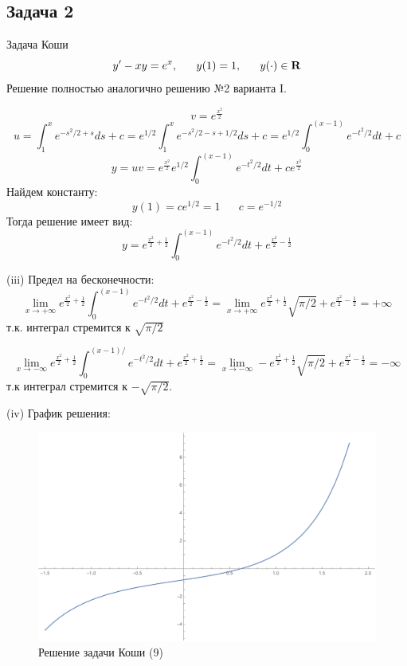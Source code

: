 \documentclass[a4paper, 12pt]{article}
\begin{document}
	\subsection {Задача 2}

Задача Коши 
\begin{equation}
	y'-xy=e^{x},\;\;\;\;\;\;y(1) = 1, \;\;\;\;\;\;y(\cdot) \in \bf{R}
\end{equation}
Решение полностью аналогично решению №2 варианта I.


\[v= e^{\frac{x^2} 2}\]
\[u=\int_{1}^x e^{-s^2/2+s} ds+ c= e^{1/2} \int_{1}^{x} e^{-s^2/2-s+1/2} ds+c = e^{1/2}\int_0^{(x-1)} e^{-t^2/2} dt+c\]
\[y = uv = e^{\frac{x^2} 2}  e^{1/2}\int_{0}^{(x-1)} e^{-t^2/2} dt+ce^{\frac{x^2} 2}\] 
Найдем константу:
\[y(1)=ce^{1/2}=1\;\;\;\;\;\; c = e^{-1/2}\]
Тогда решение имеет вид:
\[y =e^{\frac{x^2} 2 + \frac 1 2 } \int_{0}^{(x-1)} e^{-t^2/2} dt+e^{\frac{x^2} 2 - \frac 1 2 }\] 

(iii) Предел на бесконечности:
\[ \lim_{x\rightarrow +\infty} e^{\frac{x^2} 2 + \frac 1 2 } \int_{0}^{(x-1)} e^{-t^2/2} dt+e^{\frac{x^2} 2 - \frac 1 2 } =\lim_{x\rightarrow +\infty} e^{\frac{x^2} 2 + \frac 1 2 }\sqrt{ \pi / 2 } +e^{\frac{x^2} 2 - \frac 1 2 } =+\infty \] т.к. интеграл стремится к $\sqrt{\pi/2} $

\[ \lim_{x\rightarrow -\infty} e^{\frac{x^2} 2 + \frac 1 2 } \int_{0}^{(x-1)/ } e^{-t^2/2} dt+e^{\frac{x^2} 2 + \frac 1 2 } =\lim_{x\rightarrow -\infty} - e^{\frac{x^2} 2 + \frac 1 2 } \sqrt{ \pi /2} +e^{\frac{x^2} 2 - \frac 1 2 } =-\infty \] т.к интеграл стремится к $-\sqrt{ \pi / 2}.$

(iv) График решения:\\
\begin{figure}[H]
	\centering
	\includegraphics[scale=0.65]{15}
	\caption{Решение задачи Коши (9)}
\end{figure}
\end{document}
